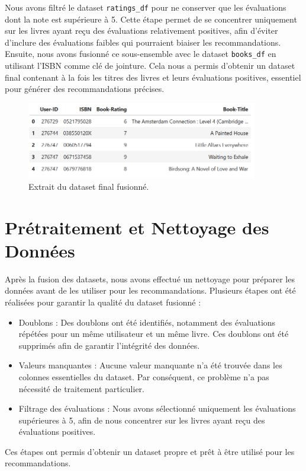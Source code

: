 \documentclass[a4paper, 12pt]{article}
\begin{document}
\vspace{0.5cm}
Nous avons filtré le dataset \texttt{ratings\_df} pour ne conserver que les évaluations dont la note est supérieure à 5. Cette étape permet de se concentrer uniquement sur les livres ayant reçu des évaluations relativement positives, afin d'éviter d'inclure des évaluations faibles qui pourraient biaiser les recommandations. Ensuite, nous avons fusionné ce sous-ensemble avec le dataset \texttt{books\_df} en utilisant l'ISBN comme clé de jointure. Cela nous a permis d’obtenir un dataset final contenant à la fois les titres des livres et leurs évaluations positives, essentiel pour générer des recommandations précises. 

\begin{figure}[H]
    \centering
    \includegraphics[width=0.9\textwidth]{final-df.png} %
    \caption{Extrait du dataset final fusionné.}
    \label{fig:mon_image}
\end{figure}

\vspace{1cm}

\newpage
\pagestyle{fancy}
\section{Prétraitement et Nettoyage des Données}

\justifying 
Après la fusion des datasets, nous avons effectué un nettoyage pour préparer les données avant de les utiliser pour les recommandations. Plusieurs étapes ont été réalisées pour garantir la qualité du dataset fusionné :
\begin{itemize}[label=\textbullet]
\item    Doublons : Des doublons ont été identifiés, notamment des évaluations répétées pour un même utilisateur et un même livre. Ces doublons ont été supprimés afin de garantir l'intégrité des données.

\item    Valeurs manquantes : Aucune valeur manquante n'a été trouvée dans les colonnes essentielles du dataset. Par conséquent, ce problème n'a pas nécessité de traitement particulier.

\item    Filtrage des évaluations : Nous avons sélectionné uniquement les évaluations supérieures à 5, afin de nous concentrer sur les livres ayant reçu des évaluations positives.
\end{itemize}
Ces étapes ont permis d'obtenir un dataset propre et prêt à être utilisé pour les recommandations.
\end{document}
